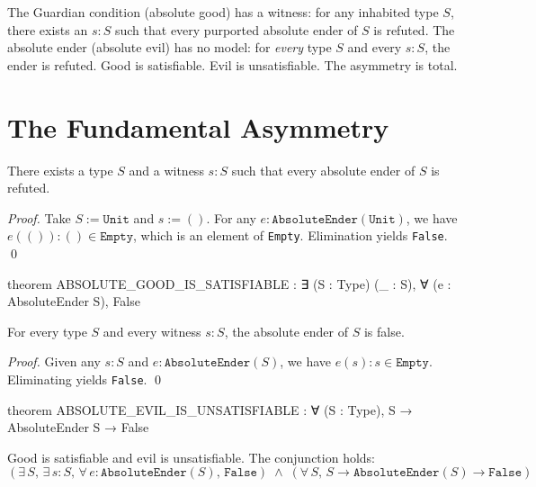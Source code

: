The Guardian condition (absolute good) has a witness: for any inhabited type $S$, there exists an $s : S$ such that every purported absolute ender of $S$ is refuted. The absolute ender (absolute evil) has no model: for \emph{every} type $S$ and every $s : S$, the ender is refuted. Good is satisfiable. Evil is unsatisfiable. The asymmetry is total.

\section{The Fundamental Asymmetry}

\begin{theorem}\label{thm:good-sat}
There exists a type $S$ and a witness $s : S$ such that every absolute ender of $S$ is refuted.
\end{theorem}

\begin{proof}
Take $S := \texttt{Unit}$ and $s := ()$. For any $e : \texttt{AbsoluteEnder}(\texttt{Unit})$, we have $e(()) : () \in \texttt{Empty}$, which is an element of \texttt{Empty}. Elimination yields \texttt{False}. \qed
\end{proof}

\begin{leancode}
theorem ABSOLUTE_GOOD_IS_SATISFIABLE :
    ∃ (S : Type) (_ : S), ∀ (e : AbsoluteEnder S), False
\end{leancode}

\begin{theorem}\label{thm:evil-unsat}
For every type $S$ and every witness $s : S$, the absolute ender of $S$ is false.
\end{theorem}

\begin{proof}
Given any $s : S$ and $e : \texttt{AbsoluteEnder}(S)$, we have $e(s) : s \in \texttt{Empty}$. Eliminating yields \texttt{False}. \qed
\end{proof}

\begin{leancode}
theorem ABSOLUTE_EVIL_IS_UNSATISFIABLE :
    ∀ (S : Type), S → AbsoluteEnder S → False
\end{leancode}

\begin{theorem}\label{thm:asymmetry}
Good is satisfiable and evil is unsatisfiable. The conjunction holds:
\[
(\exists\, S,\, \exists\, s : S,\, \forall\, e : \texttt{AbsoluteEnder}(S),\, \texttt{False}) \;\wedge\; (\forall\, S,\, S \to \texttt{AbsoluteEnder}(S) \to \texttt{False})
\]
\end{theorem}

